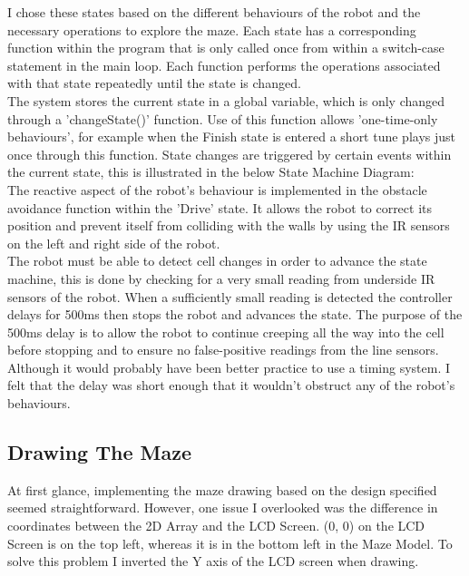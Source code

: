 \documentclass[a4paper]{article}
\begin{document}
	I chose these states based on the different behaviours of the robot and the necessary operations to explore the maze. Each state has a corresponding function within the program that is only called once from within a switch-case statement in the main loop. Each function performs the operations associated with that state repeatedly until the state is changed.\\
	
	The system stores the current state in a global variable, which is only changed through a 'changeState()' function. Use of this function allows 'one-time-only behaviours', for example when the Finish state is entered a short tune plays just once through this function. State changes are triggered by certain events within the current state, this is illustrated in the below State Machine Diagram: \\
	
	The reactive aspect of the robot's behaviour is implemented in the obstacle avoidance function within the 'Drive' state. It allows the robot to correct its position and prevent itself from colliding with the walls by using the IR sensors on the left and right side of the robot.\\
	
	The robot must be able to detect cell changes in order to advance the state machine, this is done by checking for a very small reading from underside IR sensors of the robot. When a sufficiently small reading is detected the controller delays for 500ms then stops the robot and advances the state. The purpose of the 500ms delay is to allow the robot to continue creeping all the way into the cell before stopping and to ensure no false-positive readings from the line sensors. Although it would probably have been better practice to use a timing system. I felt that the delay was short enough that it wouldn't obstruct any of the robot's behaviours.
	
	
	\subsection{Drawing The Maze}
	At first glance, implementing the maze drawing based on the design specified seemed straightforward. However, one issue I overlooked was the difference in coordinates between the 2D Array and the LCD Screen. (0, 0) on the LCD Screen is on the top left, whereas it is in the bottom left in the Maze Model. To solve this problem I inverted the Y axis of the LCD screen when drawing.\\
	
\end{document}
